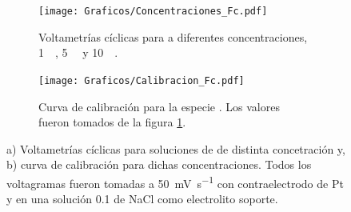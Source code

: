 { 	 				%
		 		 \begin{figure}[ht]
		 	      \begin{subfigure}[t]{0.495\textwidth}
		          	\texttt{[image: Graficos/Concentraciones\_Fc.pdf]}
		         	\caption{Voltametrías cíclicas para \fc\space a diferentes concentraciones, \SI{1}{\milli\Molar}, \SI{5}{\milli\Molar} y \SI{10}{\milli\Molar}.}
		          	\label{fig:Fc_a}
		      		\end{subfigure}
		      	 \begin{subfigure}[t]{0.495\textwidth}
		          	\texttt{[image: Graficos/Calibracion\_Fc.pdf]}
		         	\caption{Curva de calibración para la especie \fc. Los valores fueron tomados de la figura \ref{fig:Fc_a}.}
		          	\label{fig:Fc_b}
		      		\end{subfigure}
		      	 \caption[Respuesta electroquímica para \fc]{a) Voltametrías cíclicas para soluciones de \fc\space de distinta concetración y, b) curva de calibración para dichas concentraciones. Todos los voltagramas fueron tomadas a \SI{50}{\milli\volt\per\second} con contraelectrodo de Pt y en una solución \SI{0.1}{\Molar} de NaCl como electrolito soporte.}
		      	 \label{Fig:Fc}
	      		 \end{figure}

				 	 

				 	 
}
